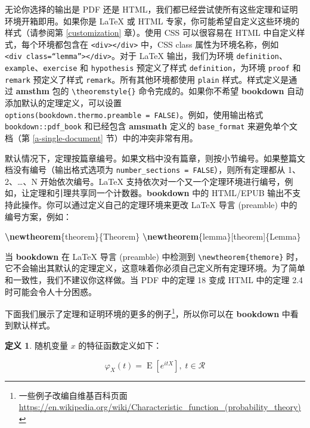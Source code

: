 \documentclass[
  12pt,
]{krantz}
\newenvironment{Shaded}{\begin{snugshade}}{\end{snugshade}}
\newcommand{\FunctionTok}[1]{\textcolor[rgb]{0.13,0.29,0.53}{\textbf{#1}}}
\newcommand{\NormalTok}[1]{#1}
\theoremstyle{definition}
\newtheorem{definition}{定义}[chapter]
\theoremstyle{definition}
\theoremstyle{definition}
\theoremstyle{definition}
\theoremstyle{remark}
\begin{document}
无论你选择的输出是 PDF 还是 HTML，我们都已经尝试使所有这些定理和证明环境开箱即用。如果你是 LaTeX 或 HTML 专家，你可能希望自定义这些环境的样式（请参阅第 \ref{customization} 章）。使用 CSS 可以很容易在 HTML 中自定义样式，每个环境都包含在 \texttt{\textless{}div\textgreater{}\textless{}/div\textgreater{}} 中，CSS class 属性为环境名称，例如 \texttt{\textless{}div\ class=“lemma”\textgreater{}\textless{}/div\textgreater{}}。对于 LaTeX 输出，我们为环境 \texttt{definition}、\texttt{example}、\texttt{exercise} 和 \texttt{hypothesis} 预定义了样式 \texttt{definition}，为环境 \texttt{proof} 和 \texttt{remark} 预定义了样式 \texttt{remark}。所有其他环境都使用 \texttt{plain} 样式。样式定义是通过 \textbf{amsthm} 包的 \texttt{\textbackslash{}theoremstyle\{\}} 命令完成的。如果你不希望 \textbf{bookdown} 自动添加默认的定理定义，可以设置 \texttt{options(bookdown.thermo.preamble\ =\ FALSE)}。例如，使用输出格式 \texttt{bookdown::pdf\_book} 和已经包含 \textbf{amsmath} 定义的 \texttt{base\_format} 来避免单个文档（第 \ref{a-single-document} 节）中的冲突非常有用。

默认情况下，定理按篇章编号。如果文档中没有篇章，则按小节编号。如果整篇文档没有编号（输出格式选项为 \texttt{number\_sections\ =\ FALSE}），则所有定理都从 1、2、\ldots、N 开始依次编号。LaTeX 支持依次对一个又一个定理环境进行编号，例如，让定理和引理共享同一个计数器。\textbf{bookdown} 中的 HTML/EPUB 输出不支持此操作。你可以通过定义自己的定理环境来更改 LaTeX 导言 (preamble) 中的编号方案，例如：

\begin{Shaded}
\begin{Highlighting}[]
\FunctionTok{\textbackslash{}newtheorem}\NormalTok{\{theorem\}\{Theorem\}}
\FunctionTok{\textbackslash{}newtheorem}\NormalTok{\{lemma\}[theorem]\{Lemma\}}
\end{Highlighting}
\end{Shaded}

当 \textbf{bookdown} 在 LaTeX 导言 (preamble) 中检测到 \texttt{\textbackslash{}newtheorem\{themore\}} 时，它不会输出其默认的定理定义，这意味着你必须自己定义所有定理环境。为了简单和一致性，我们不建议你这样做。当 PDF 中的定理 18 变成 HTML 中的定理 2.4 时可能会令人十分困惑。

下面我们展示了定理和证明环境的更多的例子\footnote{一些例子改编自维基百科页面 \url{https://en.wikipedia.org/wiki/Characteristic_function_(probability_theory)}}，所以你可以在 \textbf{bookdown} 中看到默认样式。

\begin{definition}
随机变量 \(x\) 的特征函数定义如下：

\[\varphi _{X}(t)=\operatorname {E} \left[e^{itX}\right], \; t\in\mathcal{R}\]
\end{definition}
\end{document}

